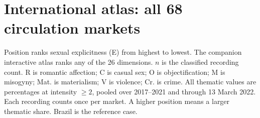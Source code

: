 \documentclass[10pt,a4paper,twocolumn]{article}
\begin{document}
\section*{International atlas: all 68 circulation markets}
\small Position ranks sexual explicitness (E) from highest to lowest. The companion interactive atlas ranks any of the 26 dimensions. $n$ is the classified recording count. R is romantic affection; C is casual sex; O is objectification; M is misogyny; Mat. is materialism; V is violence; Cr. is crime. All thematic values are percentages at intensity $\geq2$, pooled over 2017--2021 and through 13 March 2022. Each recording counts once per market. A higher position means a larger thematic share. Brazil is the reference case.\par\vspace{4pt}
\centering
\fontsize{8}{9}\selectfont\setlength{\tabcolsep}{4pt}
\end{document}
